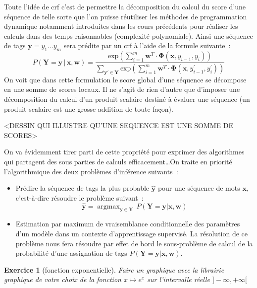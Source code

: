 \documentclass[11pt,openany]{book}
\newtheorem{exo}{Exercice}[chapter]
\newcommand{\ac}[1]{{\sc #1}} %
\begin{document}
Toute l'idée de \ac{crf} c'est de permettre la décomposition du calcul du score d'une séquence de telle sorte que l'on puisse réutiliser les méthodes de programmation dynamique notamment introduites dans les cours précédents pour réaliser les calculs dans des temps raisonnables (complexité polynomiale).  Ainsi une séquence de tags $\mathbf{y} = y_1 \ldots y_m$ sera prédite par un \ac{crf} à l'aide de la formule suivante~:
\begin{equation}
\label{eq-crf-predict}
P(\mathbf{Y} = \mathbf{y} \,|\, \mathbf{x},\mathbf{w}) = \frac{\text{exp}\left(\sum_{i=1}^m \mathbf{w}^T \cdot \boldsymbol\Phi(\mathbf{x},y_{i-1},y_i)\right)}
{\sum_{\mathbf{y}'\in \mathbf{Y}}
\text{exp}\left(\sum_{i=1}^m \mathbf{w}^T \cdot \boldsymbol\Phi(\mathbf{x},y^{'}_{i-1},y^{'}_i)\right)}
\end{equation}
On voit que dans cette formulation le score global d'une séquence se décompose en une somme de scores locaux.  Il ne s'agit de rien d'autre que d'imposer une décomposition du calcul d'un produit scalaire destiné à évaluer une séquence (un produit scalaire est une grosse addition de toute façon).

<DESSIN QUI ILLUSTRE QU'UNE SEQUENCE EST UNE SOMME DE SCORES>

On va évidemment tirer parti de cette propriété pour exprimer des algorithmes qui partagent des sous parties de calculs efficacement\ldots  On traite en priorité l'algorithmique des deux problèmes d'inférence suivants~:
\begin{itemize}
\item Prédire la séquence de tags la plus probable $\hat{\mathbf{y}}$ pour une séquence de mots $\mathbf{x}$, c'est-à-dire résoudre le problème suivant~:
\begin{equation}
\label{eq-crf-argmax}
\hat{\mathbf{y}} =  \mathop{\text{argmax}}_{\mathbf{y}\in \mathbf{Y}}
\, P(\mathbf{Y}=\mathbf{y} | \mathbf{x},\mathbf{w})
\end{equation}
\item Estimation par maximum de vraisemblance conditionnelle des paramètres d'un modèle dans un contexte d'apprentissage supervisé.
La résolution de ce problème nous fera résoudre par effet de bord le sous-problème de calcul de la probabilité d'une assignation de tags $P(\mathbf{Y}=\mathbf{y} | \mathbf{x},\mathbf{w})$.
\end{itemize}

\begin{exo}[fonction exponentielle]
Faire un graphique avec la librairie graphique de votre choix de la fonction $x\mapsto e^x $ sur l'intervalle réelle $]-\infty,+\infty[$
\end{exo}
\end{document}
